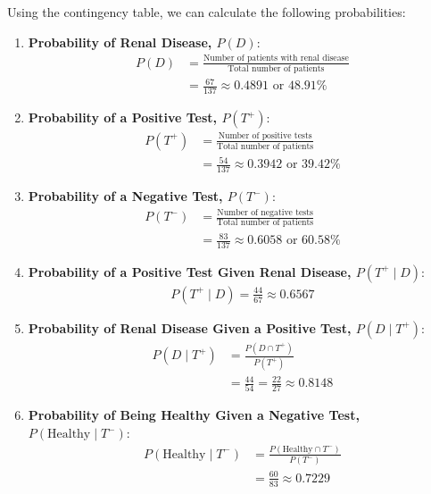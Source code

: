 \begin{solution}
    Using the contingency table, we can calculate the following probabilities:

    \begin{enumerate}[label=(\alph*)]
        \item \textbf{Probability of Renal Disease, \( P(D) \)}:
        \begin{align*}
        P(D) &= \frac{\text{Number of patients with renal disease}}{\text{Total number of patients}} \\
        &= \frac{67}{137} \approx 0.4891 \text{ or } 48.91\%
        \end{align*}
        
        \item \textbf{Probability of a Positive Test, \( P(T^+) \)}:
        \begin{align*}
        P(T^+) &= \frac{\text{Number of positive tests}}{\text{Total number of patients}} \\
        &= \frac{54}{137} \approx 0.3942 \text{ or } 39.42\%
        \end{align*}
        
        \item \textbf{Probability of a Negative Test, \( P(T^-) \)}:
        \begin{align*}
        P(T^-) &= \frac{\text{Number of negative tests}}{\text{Total number of patients}} \\
        &= \frac{83}{137} \approx 0.6058 \text{ or } 60.58\%
        \end{align*}


        \item \textbf{Probability of a Positive Test Given Renal Disease, \( P(T^+ \mid D) \)}:
        \begin{align*}
            P(T^+ \mid D)=\frac{44}{67} \approx 0.6567
        \end{align*}

        \item \textbf{Probability of Renal Disease Given a Positive Test, \( P(D \mid T^+) \)}:
        \begin{align*}
        P(D \mid T^+) &= \frac{P(D \cap T^+)}{P(T^+)} \\
        &= \frac{44}{54}=\frac{22}{27} \approx 0.8148
        \end{align*}

        \item \textbf{Probability of Being Healthy Given a Negative Test, \( P(\text{Healthy} \mid T^-) \)}:
        \begin{align*}
        P(\text{Healthy} \mid T^-) &= \frac{P(\text{Healthy} \cap T^-)}{P(T^-)} \\
        &= \frac{60}{83} \approx 0.7229
        \end{align*}


\end{enumerate}
\end{solution}
